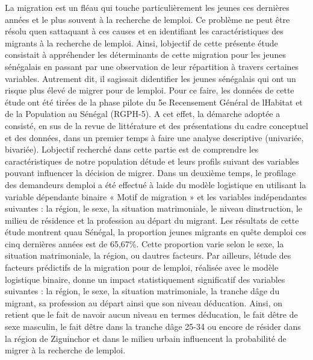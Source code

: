 \documentclass[
  letterpaper,
  DIV=11,
  numbers=noendperiod]{scrartcl}
\begin{document}
La migration est un fléau qui touche particulièrement les jeunes ces
dernières années et le plus souvent à la recherche de
l\textquotesingle emploi. Ce problème ne peut être résolu
qu\textquotesingle en s\textquotesingle attaquant à ces causes et en
identifiant les caractéristiques des migrants à la recherche de
l\textquotesingle emploi. Ainsi, l\textquotesingle objectif de cette
présente étude consistait à appréhender les déterminants de cette
migration pour les jeunes sénégalais en passant par une observation de
leur répartition à travers certaines variables. Autrement dit, il
s\textquotesingle agissait d\textquotesingle identifier les jeunes
sénégalais qui ont un risque plus élevé de migrer pour de
l\textquotesingle emploi. Pour ce faire, les données de cette étude ont
été tirées de la phase pilote du 5e Recensement Général de
l\textquotesingle Habitat et de la Population au Sénégal (RGPH-5). A cet
effet, la démarche adoptée a consisté, en sus de la revue de littérature
et des présentations du cadre conceptuel et des données, dans un premier
temps à faire une analyse descriptive (univariée, bivariée).
L\textquotesingle objectif recherché dans cette partie est de comprendre
les caractéristiques de notre population d\textquotesingle étude et
leurs profils suivant des variables pouvant influencer la décision de
migrer. Dans un deuxième temps, le profilage des demandeurs
d\textquotesingle emploi a été effectué à l\textquotesingle aide du
modèle logistique en utilisant la variable dépendante binaire « Motif de
migration » et les variables indépendantes suivantes : la région, le
sexe, la situation matrimoniale, le niveau
d\textquotesingle instruction, le milieu de résidence et la profession
au départ du migrant. Les résultats de cette étude montrent
qu\textquotesingle au Sénégal, la proportion jeunes migrants en quête
d\textquotesingle emploi ces cinq dernières années est de 65,67\%. Cette
proportion varie selon le sexe, la situation matrimoniale, la région, ou
d\textquotesingle autres facteurs. Par ailleurs, l\textquotesingle étude
des facteurs prédictifs de la migration pour de
l\textquotesingle emploi, réalisée avec le modèle logistique binaire,
donne un impact statistiquement significatif des variables suivantes :
la région, le sexe, la situation matrimoniale, la tranche
d\textquotesingle âge du migrant, sa profession au départ ainsi que son
niveau d\textquotesingle éducation. Ainsi, on retient que le fait de
n\textquotesingle avoir aucun niveau en termes
d\textquotesingle éducation, le fait d\textquotesingle être de sexe
masculin, le fait d\textquotesingle être dans la tranche
d\textquotesingle âge 25-34 ou encore de résider dans la région de
Ziguinchor et dans le milieu urbain influencent la probabilité de migrer
à la recherche de l\textquotesingle emploi.
\end{document}
